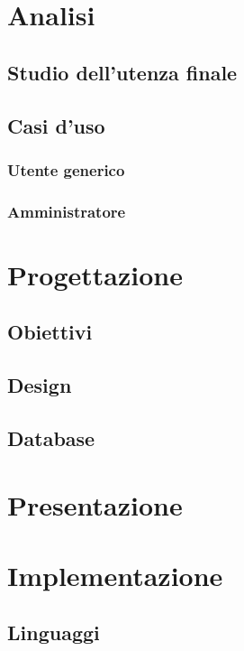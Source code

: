 \documentclass[a4paper, dvipsnames, table]{article}
\begin{document}
\newpage
\section{Analisi}
	\subsection{Studio dell'utenza finale}
		
	\subsection{Casi d'uso}
		\subsubsection{Utente generico}
			
		\subsubsection{Amministratore}
			

\newpage
\section{Progettazione}%
	\subsection{Obiettivi}
	\subsection{Design}%
	\subsection{Database}
		

\newpage
\section{Presentazione}%

\newpage
\section{Implementazione}%
	\subsection{Linguaggi}
\end{document}
